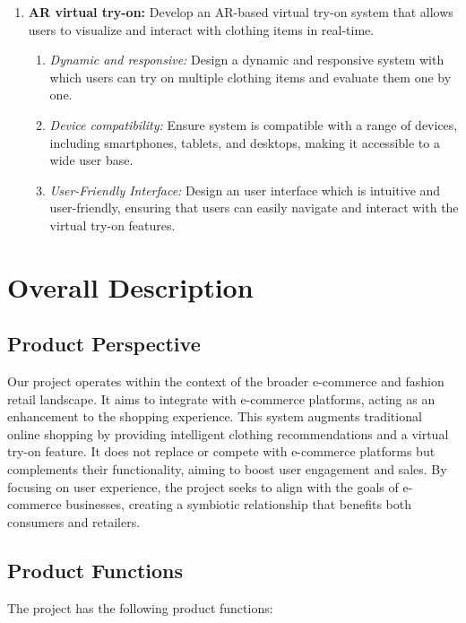 \begin{enumerate}
\begin{enumerate}
				\end{enumerate}
			\item \textbf{AR virtual try-on:} Develop an AR-based virtual try-on system that allows users to visualize and interact with clothing items in real-time.
				\begin{enumerate}
					\item \textit{Dynamic and responsive:} Design a dynamic and responsive system with which users can try on multiple clothing items and evaluate them one by one.
					\item \textit{Device compatibility:} Ensure system is compatible with a range of devices, including smartphones, tablets, and desktops, making it accessible to a wide user base.
					\item \textit{User-Friendly Interface:} Design an user interface which is intuitive and user-friendly, ensuring that users can easily navigate and interact with the virtual try-on features.
				\end{enumerate}
		\end{enumerate}

\section{Overall Description}
	\subsection{Product Perspective}
		Our project operates within the context of the broader e-commerce and fashion retail landscape. It aims to integrate with e-commerce platforms, acting as an enhancement to the shopping experience. This system augments traditional online shopping by providing intelligent clothing recommendations and a virtual try-on feature. It does not replace or compete with e-commerce platforms but complements their functionality, aiming to boost user engagement and sales. By focusing on user experience, the project seeks to align with the goals of e-commerce businesses, creating a symbiotic relationship that benefits both consumers and retailers.
	
	\subsection{Product Functions}
		The project has the following product functions:

